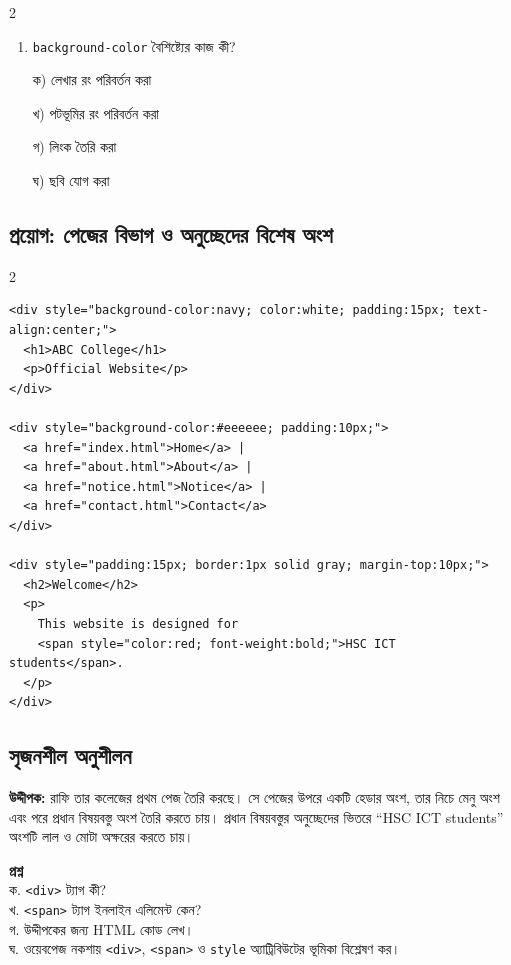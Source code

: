 \begin{multicols}{2}
\begin{enumerate}[leftmargin=*,itemsep=5pt]
\item \begin{minipage}[t]{\linewidth}\vspace{0pt}
\texttt{background-color} বৈশিষ্ট্যের কাজ কী?
\par ক) লেখার রং পরিবর্তন করা
\par খ) পটভূমির রং পরিবর্তন করা
\par গ) লিংক তৈরি করা
\par ঘ) ছবি যোগ করা
\end{minipage}
\end{enumerate}
\end{multicols}


\subsection{প্রয়োগ: পেজের বিভাগ ও অনুচ্ছেদের বিশেষ অংশ}


\par{}\par
\begin{multicols}{2}
\begin{verbatim}
<div style="background-color:navy; color:white; padding:15px; text-align:center;">
  <h1>ABC College</h1>
  <p>Official Website</p>
</div>

<div style="background-color:#eeeeee; padding:10px;">
  <a href="index.html">Home</a> |
  <a href="about.html">About</a> |
  <a href="notice.html">Notice</a> |
  <a href="contact.html">Contact</a>
</div>

<div style="padding:15px; border:1px solid gray; margin-top:10px;">
  <h2>Welcome</h2>
  <p>
    This website is designed for
    <span style="color:red; font-weight:bold;">HSC ICT students</span>.
  </p>
</div>
\end{verbatim}
\end{multicols}



\subsection{সৃজনশীল অনুশীলন}

\begin{practicebox}
\textbf{উদ্দীপক:} রাফি তার কলেজের প্রথম পেজ তৈরি করছে। সে পেজের উপরে একটি হেডার অংশ, তার নিচে মেনু অংশ এবং পরে প্রধান বিষয়বস্তু অংশ তৈরি করতে চায়। প্রধান বিষয়বস্তুর অনুচ্ছেদের ভিতরে ``HSC ICT students'' অংশটি লাল ও মোটা অক্ষরের করতে চায়।

\textbf{প্রশ্ন}\\
ক. \texttt{<div>} ট্যাগ কী?\\
খ. \texttt{<span>} ট্যাগ ইনলাইন এলিমেন্ট কেন?\\
গ. উদ্দীপকের জন্য HTML কোড লেখ।\\
ঘ. ওয়েবপেজ নকশায় \texttt{<div>}, \texttt{<span>} ও \texttt{style} অ্যাট্রিবিউটের ভূমিকা বিশ্লেষণ কর।
\end{practicebox}

